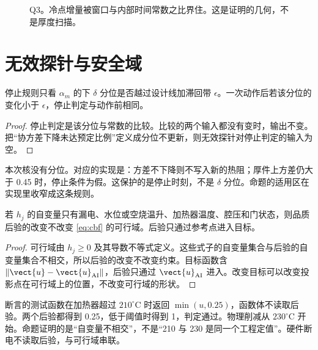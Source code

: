 \begin{figure}[ht]
\centering
{}
\caption{Q3。冷点增量被窗口与内部时间常数之比界住。这是证明的几何，不是厚度扫描。}
\end{figure}

\section{无效探针与安全域}

\begin{proposition}[分位滞回]
\label{prop:invalid}
停止规则只看 \(\alpha_m\) 的下 \(\delta\) 分位是否越过设计线加滞回带 \(\epsilon\)。一次动作后若该分位的变化小于 \(\epsilon\)，停止判定与动作前相同。
\end{proposition}

\begin{proof}
停止判定是该分位与常数的比较。比较的两个输入都没有变时，输出不变。把“协方差下降未达预定比例”定义成分位不更新，则无效探针对停止判定的输入为空。
\end{proof}

本次核没有分位。对应的实现是：方差不下降则不写入新的热阻；厚件上方差仍大于 0.45 时，停止条件为假。这保护的是停止时刻，不是 \(\delta\) 分位。命题的适用区在实现里收窄成这条规则。

\begin{proposition}[可行域与后验分离]
\label{prop:shield}
若 \(h_j\) 的自变量只有漏电、水位或空烧温升、加热器温度、腔压和门状态，则品质后验的改变不改变 \eqref{eq:cbf} 的可行域。后验只通过参考点进入目标。
\end{proposition}

\begin{proof}
可行域由 \(h_j\ge 0\) 及其导数不等式定义。这些式子的自变量集合与后验的自变量集合不相交，所以后验的改变不改变约束。目标函数含 \(\|\vect{u}-\vect{u}_{\mathrm{AI}}\|\)，后验只通过 \(\vect{u}_{\mathrm{AI}}\) 进入。改变目标可以改变投影点在可行域上的位置，不改变可行域的形状。
\end{proof}

断言的测试函数在加热器超过 \(210^\circ\mathrm{C}\) 时返回 \(\min(u,0.25)\)，函数体不读取后验。两个后验都得到 0.25，低于阈值时得到 1，判定通过。物理削减从 \(230^\circ\mathrm{C}\) 开始。命题证明的是“自变量不相交”，不是“210 与 230 是同一个工程定值”。硬件断电不读取后验，与可行域串联。


